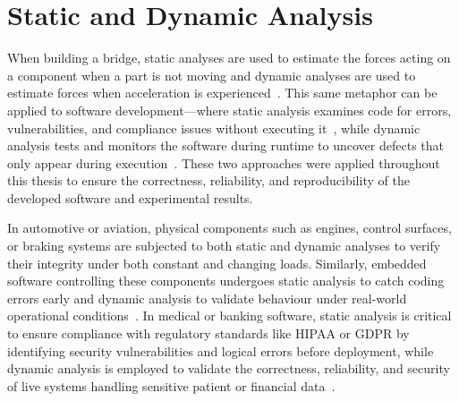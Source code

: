 \section{Static and Dynamic Analysis}

When building a bridge, static analyses are used to estimate the forces acting on a component when a part is not moving and dynamic analyses are used to estimate forces when acceleration is experienced~\cite{structural_eng}.
This same metaphor can be applied to software development---where static analysis examines code for errors, vulnerabilities, and compliance issues without executing it~\cite{beller2016analyzing}, while dynamic analysis tests and monitors the software during runtime to uncover defects that only appear during execution~\cite{ball1999concept}. 
These two approaches were applied throughout this thesis to ensure the correctness, reliability, and reproducibility of the developed software and experimental results.

In automotive or aviation, physical components such as engines, control surfaces, or braking systems are subjected to both static and dynamic analyses to verify their integrity under both constant and changing loads. Similarly, embedded software controlling these components undergoes static analysis to catch coding errors early and dynamic analysis to validate behaviour under real-world operational conditions~\cite{boeing777}.
In medical or banking software, static analysis is critical to ensure compliance with regulatory standards like HIPAA or GDPR by identifying security vulnerabilities and logical errors before deployment, while dynamic analysis is employed to validate the correctness, reliability, and security of live systems handling sensitive patient or financial data~\cite{jetley2008static,kuncoro2017mobile}.

